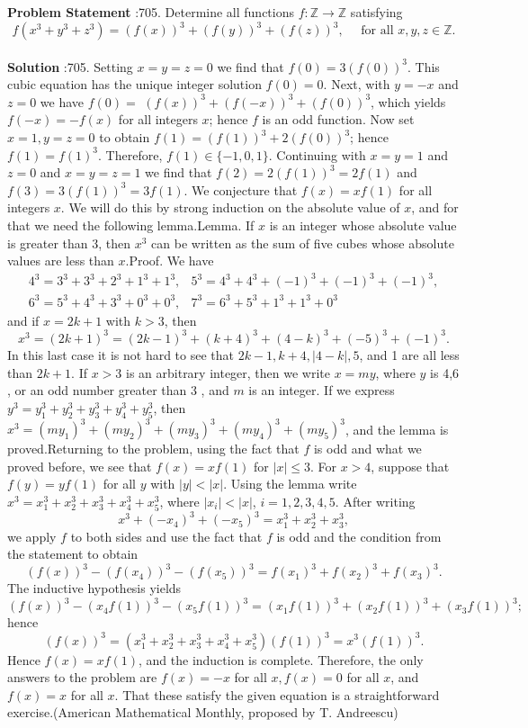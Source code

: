\documentclass[10pt]{article}
\begin{document}
\textbf{Problem Statement} :705. Determine all functions $f: \mathbb{Z} \rightarrow \mathbb{Z}$ satisfying$$ f\left(x^{3}+y^{3}+z^{3}\right)=(f(x))^{3}+(f(y))^{3}+(f(z))^{3}, \quad \text { for all } x, y, z \in \mathbb{Z} . $$\\
\textbf{Solution} :705. Setting $x=y=z=0$ we find that $f(0)=3(f(0))^{3}$. This cubic equation has the unique integer solution $f(0)=0$. Next, with $y=-x$ and $z=0$ we have $f(0)=$ $(f(x))^{3}+(f(-x))^{3}+(f(0))^{3}$, which yields $f(-x)=-f(x)$ for all integers $x$; hence $f$ is an odd function. Now set $x=1, y=z=0$ to obtain $f(1)=(f(1))^{3}+2(f(0))^{3}$; hence $f(1)=f(1)^{3}$. Therefore, $f(1) \in\{-1,0,1\}$. Continuing with $x=y=1$ and $z=0$ and $x=y=z=1$ we find that $f(2)=2(f(1))^{3}=2 f(1)$ and $f(3)=3(f(1))^{3}=3 f(1)$. We conjecture that $f(x)=x f(1)$ for all integers $x$. We will do this by strong induction on the absolute value of $x$, and for that we need the following lemma.Lemma. If $x$ is an integer whose absolute value is greater than 3, then $x^{3}$ can be written as the sum of five cubes whose absolute values are less than $x$.Proof. We have$$ \begin{array}{ll} 4^{3}=3^{3}+3^{3}+2^{3}+1^{3}+1^{3}, & 5^{3}=4^{3}+4^{3}+(-1)^{3}+(-1)^{3}+(-1)^{3}, \\ 6^{3}=5^{3}+4^{3}+3^{3}+0^{3}+0^{3}, & 7^{3}=6^{3}+5^{3}+1^{3}+1^{3}+0^{3} \end{array} $$and if $x=2 k+1$ with $k>3$, then$$ x^{3}=(2 k+1)^{3}=(2 k-1)^{3}+(k+4)^{3}+(4-k)^{3}+(-5)^{3}+(-1)^{3} . $$In this last case it is not hard to see that $2 k-1, k+4,|4-k|, 5$, and 1 are all less than $2 k+1$. If $x>3$ is an arbitrary integer, then we write $x=m y$, where $y$ is 4,6 , or an odd number greater than 3 , and $m$ is an integer. If we express $y^{3}=y_{1}^{3}+y_{2}^{3}+y_{3}^{3}+y_{4}^{3}+y_{5}^{3}$, then $x^{3}=\left(m y_{1}\right)^{3}+\left(m y_{2}\right)^{3}+\left(m y_{3}\right)^{3}+\left(m y_{4}\right)^{3}+\left(m y_{5}\right)^{3}$, and the lemma is proved.Returning to the problem, using the fact that $f$ is odd and what we proved before, we see that $f(x)=x f(1)$ for $|x| \leq 3$. For $x>4$, suppose that $f(y)=y f(1)$ for all $y$ with $|y|<|x|$. Using the lemma write $x^{3}=x_{1}^{3}+x_{2}^{3}+x_{3}^{3}+x_{4}^{3}+x_{5}^{3}$, where $\left|x_{i}\right|<|x|$, $i=1,2,3,4,5$. After writing$$ x^{3}+\left(-x_{4}\right)^{3}+\left(-x_{5}\right)^{3}=x_{1}^{3}+x_{2}^{3}+x_{3}^{3}, $$we apply $f$ to both sides and use the fact that $f$ is odd and the condition from the statement to obtain$$ (f(x))^{3}-\left(f\left(x_{4}\right)\right)^{3}-\left(f\left(x_{5}\right)\right)^{3}=f\left(x_{1}\right)^{3}+f\left(x_{2}\right)^{3}+f\left(x_{3}\right)^{3} . $$The inductive hypothesis yields$$ (f(x))^{3}-\left(x_{4} f(1)\right)^{3}-\left(x_{5} f(1)\right)^{3}=\left(x_{1} f(1)\right)^{3}+\left(x_{2} f(1)\right)^{3}+\left(x_{3} f(1)\right)^{3} ; $$hence$$ (f(x))^{3}=\left(x_{1}^{3}+x_{2}^{3}+x_{3}^{3}+x_{4}^{3}+x_{5}^{3}\right)(f(1))^{3}=x^{3}(f(1))^{3} . $$Hence $f(x)=x f(1)$, and the induction is complete. Therefore, the only answers to the problem are $f(x)=-x$ for all $x, f(x)=0$ for all $x$, and $f(x)=x$ for all $x$. That these satisfy the given equation is a straightforward exercise.(American Mathematical Monthly, proposed by T. Andreescu)\\
\end{document}
